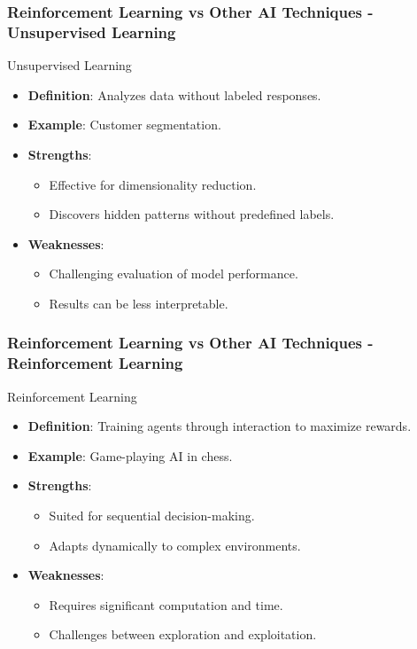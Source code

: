 \documentclass{beamer}
\begin{document}
\begin{frame}[fragile]
    \frametitle{Reinforcement Learning vs Other AI Techniques - Unsupervised Learning}
    \begin{block}{Unsupervised Learning}
        \begin{itemize}
            \item \textbf{Definition}: Analyzes data without labeled responses.
            \item \textbf{Example}: Customer segmentation.
            \item \textbf{Strengths}:
                \begin{itemize}
                    \item Effective for dimensionality reduction.
                    \item Discovers hidden patterns without predefined labels.
                \end{itemize}
            \item \textbf{Weaknesses}:
                \begin{itemize}
                    \item Challenging evaluation of model performance.
                    \item Results can be less interpretable.
                \end{itemize}
        \end{itemize}
    \end{block}
\end{frame}

\begin{frame}[fragile]
    \frametitle{Reinforcement Learning vs Other AI Techniques - Reinforcement Learning}
    \begin{block}{Reinforcement Learning}
        \begin{itemize}
            \item \textbf{Definition}: Training agents through interaction to maximize rewards.
            \item \textbf{Example}: Game-playing AI in chess.
            \item \textbf{Strengths}:
                \begin{itemize}
                    \item Suited for sequential decision-making.
                    \item Adapts dynamically to complex environments.
                \end{itemize}
            \item \textbf{Weaknesses}:
                \begin{itemize}
                    \item Requires significant computation and time.
                    \item Challenges between exploration and exploitation.
                \end{itemize}
        \end{itemize}
    \end{block}
\end{frame}
\end{document}
